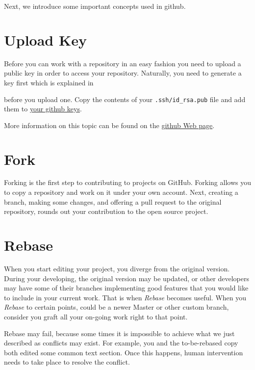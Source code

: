 Next, we introduce some important concepts used in github.

\section{Upload Key}\label{upload-key}

Before you can work with a repository in an easy fashion you need to
upload a public key in order to access your repository. Naturally, you
need to generate a key first which is explained in 


before you upload one. Copy the contents of your
\verb|.ssh/id_rsa.pub| file and add them to
\href{https://github.com/settings/keys}{your github keys}.

More information on this topic can be found on the
\href{https://help.github.com/articles/adding-a-new-ssh-key-to-your-github-account/}{github
  Web page}.

\section{Fork}\label{fork}

Forking is the first step to contributing to projects on GitHub. Forking
allows you to copy a repository and work on it under your own account.
Next, creating a branch, making some changes, and offering a pull
request to the original repository, rounds out your contribution to the
open source project.


\section{Rebase}\label{rebase}

When you start editing your project, you diverge from the original
version. During your developing, the original version may be updated, or
other developers may have some of their branches implementing good
features that you would like to include in your current work. That is
when \textit{Rebase} becomes useful. When you \textit{Rebase} to certain points, could
be a newer Master or other custom branch, consider you graft all your
on-going work right to that point.

Rebase may fail, because some times it is impossible to achieve what we
just described as conflicts may exist. For example, you and the to-be-rebased copy
both edited some common text section. Once this happens, human
intervention needs to take place to resolve the conflict.


